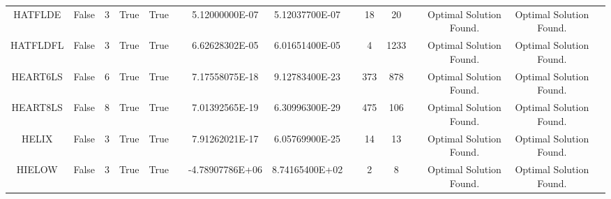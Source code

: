 \begin{longtable}{ccccccccccccccc}
	\cellcolor{default2} HATFLDE& \cellcolor{default2} False& \cellcolor{default2} 3& \cellcolor{default2} True& \cellcolor{default2} True& \cellcolor{header} & \cellcolor{best} 5.12000000E-07& \cellcolor{ok} 5.12037700E-07& \cellcolor{header} & \cellcolor{best} 18& \cellcolor{ok} 20& \cellcolor{header} & \cellcolor{default2} Optimal Solution Found.& \cellcolor{default2} Optimal Solution Found.& \cellcolor{header} \\
	\cellcolor{default1} HATFLDFL& \cellcolor{default1} False& \cellcolor{default1} 3& \cellcolor{default1} True& \cellcolor{default1} True& \cellcolor{header} & \cellcolor{ok} 6.62628302E-05& \cellcolor{best} 6.01651400E-05& \cellcolor{header} & \cellcolor{best} 4& \cellcolor{poor} 1233& \cellcolor{header} & \cellcolor{default1} Optimal Solution Found.& \cellcolor{default1} Optimal Solution Found.& \cellcolor{header} \\
	\cellcolor{default2} HEART6LS& \cellcolor{default2} False& \cellcolor{default2} 6& \cellcolor{default2} True& \cellcolor{default2} True& \cellcolor{header} & \cellcolor{ok} 7.17558075E-18& \cellcolor{best} 9.12783400E-23& \cellcolor{header} & \cellcolor{best} 373& \cellcolor{poor} 878& \cellcolor{header} & \cellcolor{default2} Optimal Solution Found.& \cellcolor{default2} Optimal Solution Found.& \cellcolor{header} \\
	\cellcolor{default1} HEART8LS& \cellcolor{default1} False& \cellcolor{default1} 8& \cellcolor{default1} True& \cellcolor{default1} True& \cellcolor{header} & \cellcolor{ok} 7.01392565E-19& \cellcolor{best} 6.30996300E-29& \cellcolor{header} & \cellcolor{poor} 475& \cellcolor{best} 106& \cellcolor{header} & \cellcolor{default1} Optimal Solution Found.& \cellcolor{default1} Optimal Solution Found.& \cellcolor{header} \\
	\cellcolor{default2} HELIX& \cellcolor{default2} False& \cellcolor{default2} 3& \cellcolor{default2} True& \cellcolor{default2} True& \cellcolor{header} & \cellcolor{ok} 7.91262021E-17& \cellcolor{best} 6.05769900E-25& \cellcolor{header} & \cellcolor{ok} 14& \cellcolor{best} 13& \cellcolor{header} & \cellcolor{default2} Optimal Solution Found.& \cellcolor{default2} Optimal Solution Found.& \cellcolor{header} \\
	\cellcolor{default1} HIELOW& \cellcolor{default1} False& \cellcolor{default1} 3& \cellcolor{default1} True& \cellcolor{default1} True& \cellcolor{header} & \cellcolor{best} -4.78907786E+06& \cellcolor{poor} 8.74165400E+02& \cellcolor{header} & \cellcolor{best} 2& \cellcolor{poor} 8& \cellcolor{header} & \cellcolor{default1} Optimal Solution Found.& \cellcolor{default1} Optimal Solution Found.& \cellcolor{header} \\

\end{longtable}
